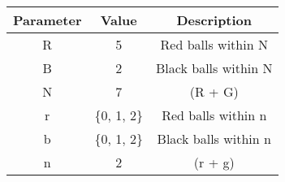 \begin{tabular}{|c|c|c|}
\hline
 Parameter & Value & Description \\
\hline \hline
 R & 5 & Red balls within N\\ 
 \hline
 B & 2 & Black balls within N \\ 
 \hline 
 N & 7 & (R + G) \\
 \hline
 r & \{0, 1, 2\} & Red balls within n \\
 \hline
 b & \{0, 1, 2\} & Black balls within n\\
 \hline 
 n & 2 & (r + g)\\
 \hline  
\end{tabular}
